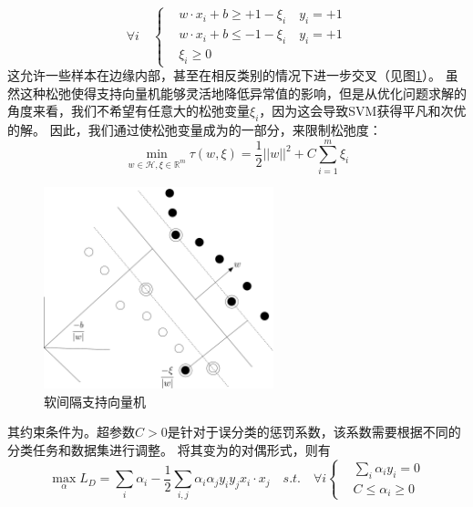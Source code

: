\begin{equation}
	\forall i \quad
	\left\{
	 \begin{aligned}
	&w\cdot x_i + b \geq +1-\xi_i \quad y_i=+1  \\
	&w\cdot x_i + b \leq -1-\xi_i \quad y_i=+1  \\
	&\xi_i \geq 0
	\end{aligned}
	 \right.
	\label{equ:constraint_soft}
\end{equation}
这允许一些样本在边缘内部，甚至在相反类别的情况下进一步交叉（见图\ref{fig:softmargin}）。 虽然这种松弛使得支持向量机能够灵活地降低异常值的影响，但是从优化问题求解的角度来看，我们不希望有任意大的松弛变量$\xi_i$，因为这会导致SVM获得平凡和次优的解。 因此，我们通过使松弛变量成为的一部分，来限制松弛度：
\begin{equation}
	\min \limits_{w\in \mathcal{H},\xi\in \mathbb{R}^m} \tau(w,\xi)=\frac{1}{2}||w||^2+C\sum_{i=1}^m {\xi_i}
\end{equation}
\begin{figure}[hbt]
	\centering
	\includegraphics[width=6.67cm]{figures/emitter/svm_soft}
	\caption{软间隔支持向量机}
	\label{fig:softmargin}
\end{figure}
其约束条件为。超参数$C>0$是针对于误分类的惩罚系数，该系数需要根据不同的分类任务和数据集进行调整。
将其变为的对偶形式，则有
\begin{equation}
	\max \limits_{\alpha} L_D=\sum_i{\alpha_i}-\frac{1}{2}\sum_{i,j}\alpha_i\alpha_jy_iy_jx_i\cdot x_j \quad s.t. \quad \forall i
	\left\{
		\begin{aligned}
	   &\sum_i{\alpha_iy_i}=0  \\
	   &C \leq \alpha_i \geq 0
	   \end{aligned}
		\right.
	\label{equ:cdotdual}
\end{equation}

